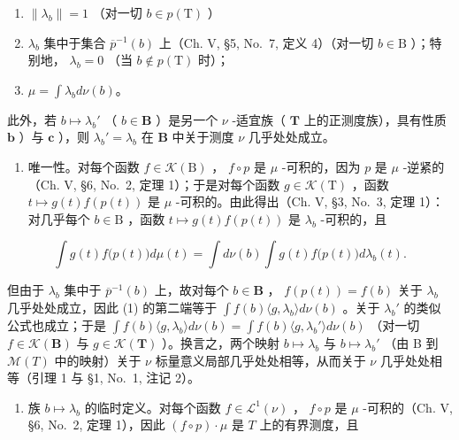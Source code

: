 \begin{enumerate}
\def\labelenumi{\alph{enumi})}
\item
  \(\| \lambda_b\| = 1\) （对一切 \(b\in p(\mathrm{T})\) ）
\item
  \(\lambda_{b}\) 集中于集合 \(\overline{p}^{-1}(b)\) 上（Ch. V, §5, No.~7, 定义 4）（对一切 \(b\in \mathrm{B}\) ）；特别地， \(\lambda_{b} = 0\) （当 \(b\notin p(\mathrm{T})\) 时）；
\item
  \(\mu = \int \lambda_b d\nu(b)\)。
\end{enumerate}

此外，若 \(b \mapsto \lambda_b'\) （ \(b \in \mathbf{B}\) ）是另一个 \(\nu\) -适宜族（ \(\mathbf{T}\) 上的正测度族），具有性质 \(\mathbf{b}\) ）与 \(\mathbf{c}\) ），则 \(\lambda_b' = \lambda_b\) 在 \(\mathbf{B}\) 中关于测度 \(\nu\) 几乎处处成立。

\begin{enumerate}
\def\labelenumi{\arabic{enumi})}
\tightlist
\item
  唯一性。对每个函数 \(f \in \mathcal{K}(\mathrm{B})\) ， \(f \circ p\) 是 \(\mu\) -可积的，因为 \(p\) 是 \(\mu\) -逆紧的（Ch. V, §6, No.~2, 定理 1）；于是对每个函数 \(g \in \mathcal{K}(\mathrm{T})\) ，函数 \(t \mapsto g(t)f(p(t))\) 是 \(\mu\) -可积的。由此得出（Ch. V, §3, No.~3, 定理 1）：对几乎每个 \(b \in \mathrm{B}\) ，函数 \(t \mapsto g(t)f(p(t))\) 是 \(\lambda_b\) -可积的，且
\end{enumerate}

\[
\int g (t) f \bigl (p (t) \bigr) d \mu (t) = \int d \nu (b) \int g (t) f \bigl (p (t) \bigr) d \lambda_ {b} (t).\tag{1}
\]

但由于 \(\lambda_{b}\) 集中于 \(\overline{p}^{-1}(b)\) 上，故对每个 \(b \in \mathbf{B}\) ， \(f(p(t)) = f(b)\) 关于 \(\lambda_{b}\) 几乎处处成立，因此 (1) 的第二端等于 \(\int f(b)\langle g, \lambda_{b} \rangle d\nu(b)\) 。关于 \(\lambda_{b}'\) 的类似公式也成立；于是 \(\int f(b)\langle g, \lambda_{b} \rangle d\nu(b) = \int f(b)\langle g, \lambda_{b}' \rangle d\nu(b)\) （对一切 \(f \in \mathcal{K}(\mathbf{B})\) 与 \(g \in \mathcal{K}(\mathbf{T})\) ）。换言之，两个映射 \(b \mapsto \lambda_{b}\) 与 \(b \mapsto \lambda_{b}'\) （由 B 到 \(\mathcal{M}(T)\) 中的映射）关于 \(\nu\) 标量意义局部几乎处处相等，从而关于 \(\nu\) 几乎处处相等（引理 1 与 §1, No.~1, 注记 2）。

\begin{enumerate}
\def\labelenumi{\arabic{enumi})}
\setcounter{enumi}{1}
\tightlist
\item
  族 \(b \mapsto \lambda_b\) 的临时定义。对每个函数 \(f \in \mathcal{L}^1(\nu)\) ， \(f \circ p\) 是 \(\mu\) -可积的（Ch. V, §6, No.~2, 定理 1），因此 \((f \circ p) \cdot \mu\) 是 \(T\) 上的有界测度，且
\end{enumerate}

